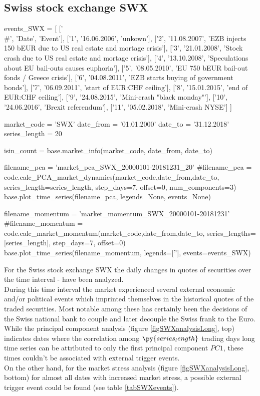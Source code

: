 \documentclass[11pt,twoside,a4paper]{article}
\begin{document}
\subsection{Swiss stock exchange SWX}
\begin{pycode}
events_SWX = [
    ['\\#',  'Date', 'Event'],
    ['1',  '16.06.2006', 'unkown'],
    ['2',  '11.08.2007', 'EZB injects 150 bEUR due to US real estate and mortage crisis'],
    ['3',  '21.01.2008', 'Stock crash due to US real estate and mortage crisis'],
    ['4',  '13.10.2008', 'Speculations about EU bail-outs causes euphoria'],
    ['5',  '08.05.2010', 'EU 750 bEUR bail-out fonds / Greece crisis'],
    ['6',  '04.08.2011', 'EZB starts buying of government bonds'],
    ['7',  '06.09.2011', 'start of EUR:CHF ceiling'],
    ['8',  '15.01.2015', 'end of EUR:CHF ceiling'],
    ['9',  '24.08.2015', 'Mini-crash "black monday"'],
    ['10', '24.06.2016', 'Brexit referendum'],
    ['11', '05.02.2018', 'Mini-crash NYSE']
    ]

market_code = 'SWX'
date_from = '01.01.2000'
date_to = '31.12.2018'
series_length = 20

isin_count = base.market_info(market_code, date_from, date_to)

filename_pca = 'market_pca_SWX_20000101-20181231_20'
#filename_pca = code.calc_PCA_market_dynamics(market_code,date_from,date_to, series_length=series_length, step_days=7, offset=0, num_components=3)
base.plot_time_series(filename_pca, legends=None, events=None)

filename_momentum = 'market_momentum_SWX_20000101-20181231'
#filename_momentum = code.calc_market_momentum(market_code,date_from,date_to, series_lengths=[series_length], step_days=7, offset=0)
base.plot_time_series(filename_momentum, legends=[''], events=events_SWX)
\end{pycode}
For the Swiss stock exchange SWX the daily changes in quotes of  securities over the time interval  -  have been analyzed.\\
During this time interval the market experienced several external economic and/or political events which imprinted themselves in the historical quotes of the traded securities. Most notable among these has certainly been the decisions of the Swiss national bank to couple and later decouple the Swiss frank to the Euro.\\
While the principal component analysis (figure \ref{figSWXanalysisLong}, top) indicates dates where the correlation among $\py{series_length}$ trading days long time series can be attributed to only the first principal component $PC1$, these times couldn't be associated with external trigger events.\\
On the other hand, for the market stress analysis (figure \ref{figSWXanalysisLong}, bottom) for almost all dates with increased market stress, a possible external trigger event could be found (see table \ref{tabSWXevents}).\\
\end{document}
